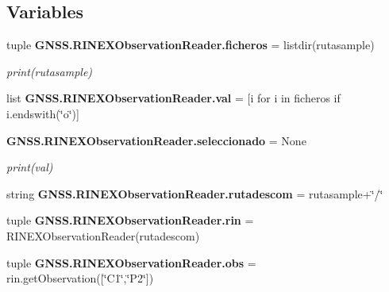 \subsection*{Variables}
\begin{DoxyCompactItemize}
\item 
tuple {\bf G\-N\-S\-S.\-R\-I\-N\-E\-X\-Observation\-Reader.\-ficheros} = listdir(rutasample)
\begin{DoxyCompactList}\small\item\em print(rutasample) \end{DoxyCompactList}\item 
list {\bf G\-N\-S\-S.\-R\-I\-N\-E\-X\-Observation\-Reader.\-val} = [i for i in ficheros if i.\-endswith(\char`\"{}o\char`\"{})]
\item 
{\bf G\-N\-S\-S.\-R\-I\-N\-E\-X\-Observation\-Reader.\-seleccionado} = None
\begin{DoxyCompactList}\small\item\em print(val) \end{DoxyCompactList}\item 
string {\bf G\-N\-S\-S.\-R\-I\-N\-E\-X\-Observation\-Reader.\-rutadescom} = rutasample+\char`\"{}/\char`\"{}
\item 
tuple {\bf G\-N\-S\-S.\-R\-I\-N\-E\-X\-Observation\-Reader.\-rin} = R\-I\-N\-E\-X\-Observation\-Reader(rutadescom)
\item 
tuple {\bf G\-N\-S\-S.\-R\-I\-N\-E\-X\-Observation\-Reader.\-obs} = rin.\-get\-Observation([\char`\"{}C1\char`\"{},\char`\"{}P2\char`\"{}])
\end{DoxyCompactItemize}
